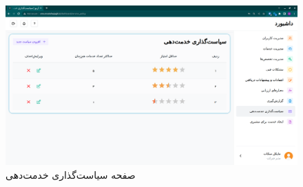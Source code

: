 \begin{figure}[h]
	\centering
	\includegraphics[width=\textwidth]{figs/user-guide/cm-service-policy}
	\caption{صفحه سیاست‌گذاری خدمت‌دهی}
	\label{cm-service-policy}
\end{figure}

\FloatBarrier
